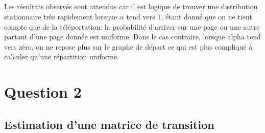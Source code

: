 \documentclass[a4paper,titlepage]{report}
\begin{document}
\paragraph{}
Les résultats observés sont attendus car il est logique de trouver une distribution stationnaire très rapidement lorsque $\alpha$ tend vers 1, étant donné que on ne tient compte que de la téléportation: la probabilité d'arriver sur une page ou une autre partant d'une page donnée est uniforme. Dans le cas contraire, lorsque alpha tend vers zéro, on ne repose plus sur le graphe de départ ce qui est plus compliqué à calculer qu'une répartition uniforme.


\chapter{Question 2}
\section{Estimation d'une matrice de transition}
\label{sec:estimateQ}
\end{document}
